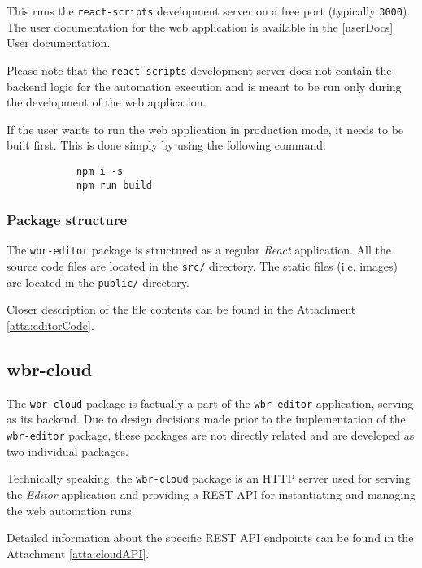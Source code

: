 This runs the \texttt{react-scripts} development server on a free port (typically \texttt{3000}).
The user documentation for the web application is available in the \autoref{userDocs} User documentation.

Please note that the \texttt{react-scripts} development server does not contain the backend logic for the automation execution
and is meant to be run only during the development of the web application.

If the user wants to run the web application in production mode, it needs to be built first. This is done simply by using the following command:
\begin{center}
    \begin{minipage}[h!]{0.5\textwidth}
        \begin{verbatim}
            npm i -s
            npm run build
        \end{verbatim}        
    \end{minipage}
\end{center}

\subsubsection{Package structure}

The \texttt{wbr-editor} package is structured as a regular \textit{React} application. 
All the source code files are located in the \texttt{src/} directory.
The static files (i.e. images) are located in the \texttt{public/} directory.

Closer description of the file contents can be found in the Attachment \ref{atta:editorCode}.

\subsection{wbr-cloud}

The \texttt{wbr-cloud} package is factually a part of the \texttt{wbr-editor} application, serving as its backend.
Due to design decisions made prior to the implementation of the \texttt{wbr-editor} package, these packages are not directly related and are developed as two individual packages.

Technically speaking, the \texttt{wbr-cloud} package is an HTTP server used for serving the \textit{Editor} application and providing a REST \ac{API} for instantiating and managing the web automation runs.

Detailed information about the specific REST API endpoints can be found in the Attachment \ref{atta:cloudAPI}.